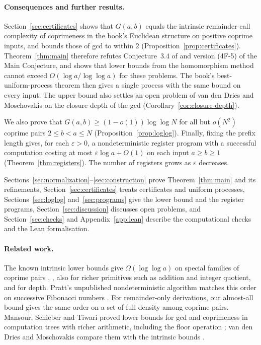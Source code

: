 \documentclass[11pt]{article}
\theoremstyle{remark}
\begin{document}
\paragraph{Consequences and further results.}
Section~\ref{sec:certificates} shows that $G(a,b)$ equals the intrinsic
remainder-call complexity of coprimeness in the book's Euclidean structure
on positive coprime inputs, and bounds those of gcd to within $2$
(Proposition~\ref{prop:certificates}). Theorem~\ref{thm:main} therefore
refutes Conjecture~3.4 of \cite{moschovakis2012} and version (4F-5) of the
Main Conjecture, and shows that lower bounds from the homomorphism method
cannot exceed $O(\log a/\log\log a)$ for these problems. The
book's best-uniform-process theorem then gives a single process with the
same bound on every input. The upper bound also settles an open problem
of van den Dries and Moschovakis on the closure depth of the gcd
(Corollary~\ref{cor:closure-depth}).

We also prove that $G(a,b)\geq(1-o(1))\log\log N$ for all but $o(N^2)$
coprime pairs $2\leq b<a\leq N$ (Proposition~\ref{prop:loglog}).
Finally, fixing the prefix length gives, for each $\varepsilon>0$, a
nondeterministic register program with a successful computation costing at
most $\varepsilon\log a+O(1)$ on each input $a\geq b\geq1$
(Theorem~\ref{thm:registers}). The
number of registers grows as $\varepsilon$ decreases.

Sections~\ref{sec:normalization}--\ref{sec:construction} prove
Theorem~\ref{thm:main} and its refinements, Section~\ref{sec:certificates}
treats certificates and uniform processes, Sections~\ref{sec:loglog}
and~\ref{sec:programs} give the lower bound and the register programs,
Section~\ref{sec:discussion} discusses open problems, and
Section~\ref{sec:checks} and Appendix~\ref{app:lean} describe the
computational checks and the Lean formalisation.

\paragraph{Related work.}
The known intrinsic lower bounds give $\Omega(\log\log a)$ on special
families of coprime pairs \cite{vddm2004,vddm2009},
\cite[Theorem~6C.5]{moschovakis2019}, also for richer primitives such as
addition and integer quotient, and for depth. Pratt's unpublished nondeterministic algorithm
\cite[Theorem~2E.2 and Problems~x2E.17--x2E.19]{moschovakis2019}
matches this order on successive Fibonacci numbers
\cite[Corollary~6C.7]{moschovakis2019}.
For remainder-only derivations, our almost-all bound gives the same order
on a set of full density among coprime pairs. Mansour, Schieber and Tiwari
proved lower bounds for gcd and coprimeness in computation trees with richer
arithmetic, including the floor operation \cite{mst1991a,mst1991b}; van den
Dries and Moschovakis compare them with the intrinsic bounds
\cite[pp.~2:3--2:4]{vddm2009}.
\end{document}
